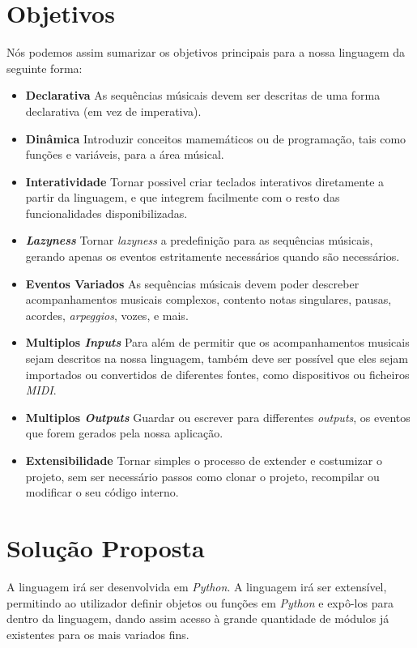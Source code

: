 \section{Objetivos}
Nós podemos assim sumarizar os objetivos principais para a nossa linguagem da seguinte forma:
\begin{itemize}
 \item \textbf{Declarativa} As sequências músicais devem ser descritas de uma forma declarativa (em vez de imperativa).
 \item \textbf{Dinâmica} Introduzir conceitos mamemáticos ou de programação, tais como funções e variáveis, para a área músical.
 \item \textbf{Interatividade} Tornar possivel criar teclados interativos diretamente a partir da linguagem, e que integrem facilmente com o resto  das funcionalidades  disponibilizadas.
 \item \textbf{\textit{Lazyness}} Tornar \textit{lazyness} a predefinição para as sequências músicais, gerando apenas os eventos estritamente necessários quando são necessários.
 \item \textbf{Eventos Variados} As sequências músicais devem poder descreber acompanhamentos musicais complexos, contento notas singulares, pausas, acordes, \textit{arpeggios}, vozes, e mais.
 \item \textbf{Multiplos \textit{Inputs}} Para além de permitir que os acompanhamentos musicais sejam descritos na nossa linguagem, também deve ser possível que eles sejam importados ou convertidos de diferentes fontes, como dispositivos ou ficheiros \textit{MIDI}.
 \item \textbf{Multiplos \textit{Outputs}} Guardar ou escrever para differentes \textit{outputs}, os eventos que forem gerados pela nossa aplicação.
 \item \textbf{Extensibilidade} Tornar simples o processo de extender e costumizar o projeto, sem ser necessário passos como clonar o projeto, recompilar ou modificar o seu código interno.
\end{itemize}

\section{Solução Proposta}
A linguagem irá ser desenvolvida em \textit{Python}. A linguagem irá ser extensível, permitindo ao utilizador definir objetos ou funções em \textit{Python} e expô-los para dentro da linguagem, dando assim acesso à grande quantidade de módulos já existentes para os mais variados fins.

